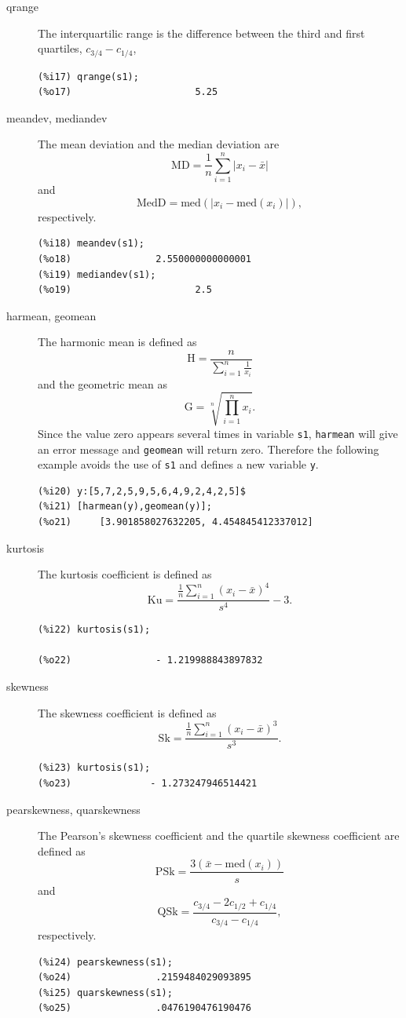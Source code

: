 \documentclass[12pt,a4paper]{article}
\begin{document}
\begin{description}
\item[qrange] The interquartilic range is the difference between the third and first quartiles, $c_{3/4}-c_{1/4}$,
\begin{verbatim}
(%i17) qrange(s1);
(%o17)                      5.25
\end{verbatim}

\item[meandev, mediandev] The mean deviation and the median deviation are
\[
\mbox{MD}= \frac{1}{n} \sum_{i=1}^n |x_i-\bar{x}|
\]
and
\[
\mbox{MedD}=\mbox{med}(|x_i-\mbox{med}(x_i)|),
\]
respectively.
\begin{verbatim}
(%i18) meandev(s1);
(%o18)               2.550000000000001
(%i19) mediandev(s1);
(%o19)                      2.5
\end{verbatim}

\item[harmean, geomean] The harmonic mean is defined as
\[
\mbox{H} = \frac{n}{\sum_{i=1}^n \frac{1}{x_i}}
\]
and the geometric mean as
\[
\mbox{G} = \sqrt[n]{\prod_{i=1}^n x_i}.
\]
Since the value zero appears several times in variable \verb|s1|, \verb|harmean| will give an error message and \verb|geomean| will return zero. Therefore the following example avoids the use of \verb|s1| and defines a new variable \verb|y|.
\begin{verbatim}
(%i20) y:[5,7,2,5,9,5,6,4,9,2,4,2,5]$
(%i21) [harmean(y),geomean(y)];
(%o21)     [3.901858027632205, 4.454845412337012]
\end{verbatim}

\item[kurtosis] The kurtosis coefficient is defined as
\[
\mbox{Ku}=\frac{\frac{1}{n} \sum_{i=1}^n (x_i-\bar{x})^4}{s^4} -3.
\]
\begin{verbatim}
(%i22) kurtosis(s1);

(%o22)               - 1.219988843897832
\end{verbatim}


\item[skewness] The skewness coefficient is defined as
\[
\mbox{Sk}=\frac{\frac{1}{n} \sum_{i=1}^n (x_i-\bar{x})^3}{s^3}.
\]
\begin{verbatim}
(%i23) kurtosis(s1);
(%o23)              - 1.273247946514421
\end{verbatim}

\item[pearskewness, quarskewness] The Pearson's skewness coefficient and the quartile skewness coefficient are defined as 
\[
\mbox{PSk}= \frac{3 (\bar{x}-\mbox{med}(x_i))}{s}
\]
and
\[
\mbox{QSk}= \frac{c_{3/4}-2 c_{1/2}+c_{1/4}}{c_{3/4}-c_{1/4}},
\]
respectively.
\begin{verbatim}
(%i24) pearskewness(s1);
(%o24)               .2159484029093895
(%i25) quarskewness(s1);
(%o25)               .0476190476190476
\end{verbatim}

\end{description}
\end{document}
